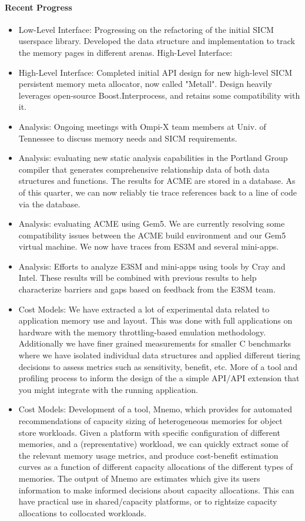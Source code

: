 \paragraph{Recent Progress}
\begin{itemize}
\item Low-Level Interface: Progressing on the refactoring of the initial SICM userspace library. Developed the data structure and implementation to track the memory pages in different arenas.
High-Level Interface: 
\item High-Level Interface: Completed initial API design for new high-level SICM persistent memory meta allocator, now called "Metall".   Design heavily leverages open-source Boost.Interprocess, and retains some compatibility with it.  
\item Analysis: Ongoing meetings with Ompi-X team members at Univ. of Tennessee to discuss memory needs and SICM requirements.
\item Analysis: evaluating new static analysis capabilities in the Portland Group compiler that generates comprehensive relationship data of both data structures and functions. The results for ACME are stored in a database. As of this quarter, we can now reliably tie trace references back to a line of code via the database.
\item Analysis: evaluating ACME using Gem5. We are currently resolving some compatibility issues between the ACME build environment and our Gem5 virtual machine. We now have traces from ES3M and several mini-apps.
\item Analysis: Efforts to analyze E3SM and mini-apps using tools by Cray and Intel. These results will be combined with previous results to help characterize barriers and gaps based on feedback from the E3SM team.
\item Cost Models: We have extracted a lot of experimental data related to application memory use and layout. This was done with full applications on hardware with the memory throttling-based emulation methodology. Additionally we have finer grained measurements for smaller C benchmarks where we have isolated individual data structures and applied different tiering decisions to assess metrics such as sensitivity, benefit, etc. More of a tool and profiling process to inform the design of the a simple API/API extension that you might integrate with the running application.~\cite{Doudali:2017:CTE:3132402.3132418}

\item Cost Models: Development of a tool, Mnemo, which provides for automated recommendations of capacity sizing of heterogeneous memories for object store workloads. Given a platform with specific configuration of different memories, and a (representative) workload, we can quickly extract some of the relevant memory usage metrics, and produce cost-benefit estimation curves as a function of different capacity allocations of the different types of memories. The output of Mnemo are estimates which give its users information to make informed decisions about capacity allocations. This can have practical use in shared/capacity platforms, or to rightsize capacity allocations to collocated workloads. 
\end{itemize}
